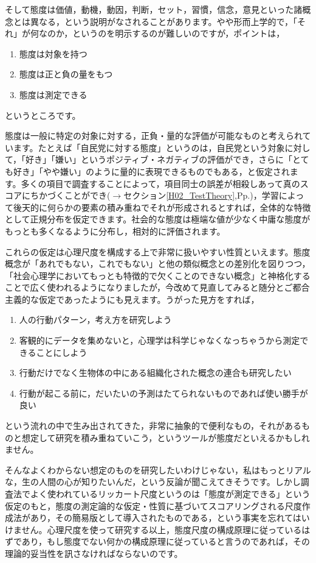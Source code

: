 \documentclass{ltjsbook}
\begin{document}
そして態度は価値，動機，動因，判断，セット，習慣，信念，意見といった諸概念とは異なる，という説明がなされることがあります。やや形而上学的で，「それ」が何なのか，というのを明示するのが難しいのですが，ポイントは，
\begin{enumerate}
	\item 態度は対象を持つ
	\item 態度は正と負の量をもつ
	\item 態度は測定できる
\end{enumerate}
というところです。

態度は一般に特定の対象に対する，正負・量的な評価が可能なものと考えられています。たとえば「自民党に対する態度」というのは，自民党という対象に対して，「好き」「嫌い」というポジティブ・ネガティブの評価ができ，さらに「とても好き」「やや嫌い」のように量的に表現できるものでもある，と仮定されます。多くの項目で調査することによって，項目同士の誤差が相殺しあって真のスコアにちかづくことができ($\to$セクション\ref{H02_TestTheory},Pp.\pageref{H02_TestTheory})，学習によって後天的に何らかの要素の積み重ねでそれが形成されるとすれば，全体的な特徴として正規分布を仮定できます。社会的な態度は極端な値が少なく中庸な態度がもっとも多くなるように分布し，相対的に評価されます。

これらの仮定は心理尺度を構成する上で非常に扱いやすい性質といえます。態度概念が「あれでもない，これでもない」と他の類似概念との差別化を図りつつ，「社会心理学においてもっとも特徴的で欠くことのできない概念\parencite{Allport1935}」と神格化することで広く使われるようになりましたが，今改めて見直してみると随分とご都合主義的な仮定であったようにも見えます。うがった見方をすれば，
\begin{enumerate}
	\item 人の行動パターン，考え方を研究しよう
	\item 客観的にデータを集めないと，心理学は科学じゃなくなっちゃうから測定できることにしよう
	\item 行動だけでなく生物体の中にある組織化された概念の連合も研究したい
	\item 行動が起こる前に，だいたいの予測はたてられないものであれば使い勝手が良い
\end{enumerate}
という流れの中で生み出されてきた，非常に抽象的で便利なもの，それがあるものと想定して研究を積み重ねていこう，というツールが態度だといえるかもしれません。


そんなよくわからない想定のものを研究したいわけじゃない，私はもっとリアルな，生の人間の心が知りたいんだ，という反論が聞こえてきそうです。しかし調査法でよく使われているリッカート尺度というのは「態度が測定できる」という仮定のもと，態度の測定論的な仮定・性質に基づいてスコアリングされる尺度作成法があり，その簡易版として導入されたものである，という事実を忘れてはいけません。心理尺度を使って研究する以上，態度尺度の構成原理に従っているはずであり，もし態度でない何かの構成原理に従っていると言うのであれば，その理論的妥当性を訊さなければならないのです。
\end{document}
